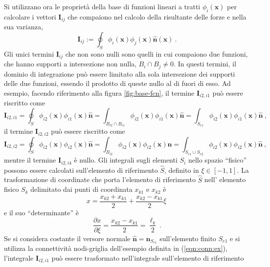 Si utilizzano ora le proprietà della base di funzioni lineari a tratti $\phi_i(\bm{x})$ per calcolare i vettori $\bm{I}_{ij}$ che compaiono nel calcolo della risultante delle forze e nella sua varianza,
\begin{equation}
 \bm{I}_{ij} := \oint_S \phi_i(\bm{x}) \phi_j(\bm{x}) \bm{\hat{n}}(\bm{x}) \ .
\end{equation} 
Gli unici termini $\bm{I}_{ij}$ che non sono nulli sono quelli in cui compaiono due funzioni, che hanno supporti a intersezione non nulla, $B_i \cap B_j \neq 0$. In questi termini, il dominio di integrazione può essere limitato alla sola intersezione dei supporti delle due funzioni, essendo il prodotto di queste nullo al di fuori di esso. Ad esempio, facendo riferimento alla figura \ref{fig:base-fcn}, il termine $\bm{I}_{i2,i1}$ può essere riscritto come
\begin{equation}
 \bm{I}_{i2,i1} = \oint_S \phi_{i2}(\bm{x})\phi_{i1}(\bm{x})\bm{\hat{n}}   
                =  \int_{B_{i2}\cap B_{i1}} \phi_{i2}(\bm{x})\phi_{i1}(\bm{x})\bm{\hat{n}}   
                =  \int_{S_{e1}} \phi_{i2}(\bm{x})\phi_{i1}(\bm{x})\bm{\hat{n}} \ , 
\end{equation}
il termine $\bm{I}_{i2,i2}$ può essere riscritto come
\begin{equation}
 \bm{I}_{i2,i2} = \oint_S \phi_{i2}(\bm{x})\phi_{i2}(\bm{x})\bm{\hat{n}}   
                =  \int_{B_{i2}} \phi_{i2}(\bm{x})\phi_{i2}(\bm{x})\bm{\hat{n}}   
                =  \int_{S_{e1}\cup S_{e2}} \phi_{i2}(\bm{x})\phi_{i2}(\bm{x})\bm{\hat{n}} \ , 
\end{equation}
mentre il termine $\bm{I}_{i2,i4}$ è  nullo.
Gli integrali sugli elementi $S_i$ nello spazio ``fisico'' possono essere calcolati sull'elemento di riferimento $\hat{S}$, definito in $\xi \in [-1,1]$. La trasformazione di coordinate che porta l'elemento di riferimento $\hat{S}$ nell' elemento fisico $S_{k}$ delimitato dai punti di coordinata $x_{k1}$ e $x_{k2}$ è
\begin{equation}
 x = \dfrac{x_{k2}+x_{k1}}{2} + \dfrac{x_{k2}-x_{k1}}{2} \xi \ 
\end{equation}
e il suo ``determinante'' è
\begin{equation}
 \dfrac{\partial x}{\partial \xi} = \dfrac{x_{k2}-x_{k1}}{2} = \dfrac{\ell_k}{2} \ .
\end{equation}
Se si considera costante il versore normale $\bm{\hat{n}} = \bm{\hat{n}}_{S_{e1}}$ sull'elemento finito $S_{e1}$  e si utilizza la connettività nodi-griglia dell'esempio definita in (\ref{eqn:conn:ex}), l'integrale $\bm{I}_{i2,i1}$ può essere trasformato nell'integrale sull'elemento di riferimento
